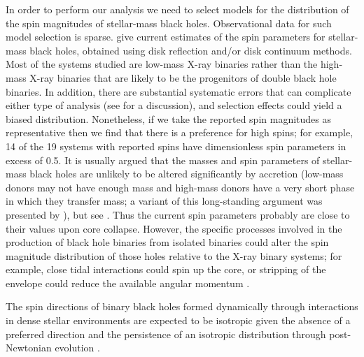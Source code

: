 \documentclass[modern,linenumbers]{aastex61}
\begin{document}
In order to perform our analysis we need to select models for the
distribution of the spin magnitudes of stellar-mass black holes.
Observational data for such model selection is sparse.
\citet{2015PhR...548....1M} give current estimates of the spin
parameters for stellar-mass black holes, obtained using disk
reflection and/or disk continuum methods.  Most of the systems studied
are low-mass X-ray binaries rather than the high-mass X-ray binaries
that are likely to be the progenitors of double black hole binaries.
In addition, there are substantial systematic errors that can
complicate either type of analysis (see \citealt{2015PhR...548....1M}
for a discussion), and selection effects could yield a biased
distribution. Nonetheless, if we take the reported spin magnitudes as
representative then we find that there is a preference for high spins;
for example, 14 of the 19 systems with reported spins have
dimensionless spin parameters in excess of 0.5.  It is usually argued
that the masses and spin parameters of stellar-mass black holes are
unlikely to be altered significantly by accretion (low-mass donors may
not have enough mass and high-mass donors have a very short phase in
which they transfer mass; a variant of this long-standing argument was
presented by \citet{1999MNRAS.305..654K}), but see
\citet{2003MNRAS.341..385P,2015ApJ...800...17F}.  Thus the current
spin parameters probably are close to their values upon core collapse.
However, the specific processes involved in the production of black
hole binaries from isolated binaries could alter the spin magnitude
distribution of those holes relative to the X-ray binary systems; for
example, close tidal interactions could spin up the core, or stripping
of the envelope could reduce the available angular momentum
\citep{2016MNRAS.462..844K,2017arXiv170200885Z,2017arXiv170203952H}.

The spin directions of binary black holes formed dynamically through
interactions in dense stellar environments
\citep{SigurdssonHernquist:1993,PZMcMillan:2000,Rodriguez:2015,Stone:2016}
are expected to be isotropic given the absence of a preferred
direction \citep[e.g.,][]{2016ApJ...832L...2R} and the persistence of
an isotropic distribution through post-Newtonian evolution
\citep{2004PhRvD..70l4020S,2007ApJ...661L.147B}.
\end{document}

